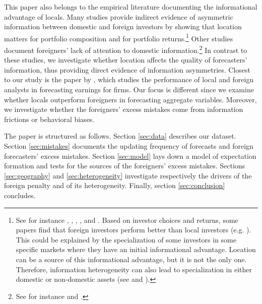 This paper also belongs to the empirical literature documenting the informational advantage of locals. Many studies provide indirect evidence of asymmetric information between domestic and foreign investors by showing that location matters for portfolio composition and for portfolio returns.\footnote{See for instance \citet{KangStulz1997}, \citet{GrinblattKeloharju2001}, \citet{PortesRey2005}, \citet{Hau2001}, and \citet{Clemensetal2020}. Based on investor choices and returns, some papers find that foreign investors perform better than local investors (e.g. \citet{GrinblattKeloharju2000}). This could be explained by the specialization of some investors in some specific markets where they have an initial informational advantage. Location can be a source of this informational advantage, but it is not the only one. Therefore, information heterogeneity can also lead to specialization in either domestic or non-domestic assets (see \citet{VanNieuwerburghVeldkamp2010} and \citet{DeMarcoetal2021}).} Other studies document foreigners' lack of attention to domestic information.\footnote{See for instance \citet{Mondriaetal2010} and \citet{Czirakietal2021}.} In contrast to these studies, we investigate whether location affects the quality of forecasters' information, thus providing direct evidence of information asymmetries. Closest to our study is the paper by \citet{Baeetal2008}, which studies the performance of local and foreign analysts in forecasting earnings for firms. Our focus is different since we examine whether locals outperform foreigners in forecasting aggregate variables. Moreover, we investigate whether the foreigners' excess mistakes come from information frictions or behavioral biases.

The paper is structured as follows. Section \ref{sec:data} describes our dataset. Section \ref{sec:mistakes} documents the updating frequency of forecasts and foreign forecasters' excess mistakes. Section \ref{sec:model} lays down a model of expectation formation and tests for the sources of the foreigners' excess mistakes. Sections \ref{sec:geography} and \ref{sec:heterogeneity} investigate respectively the drivers of the foreign penalty and of its heterogeneity. Finally, section  \ref{sec:conclusion} concludes.


